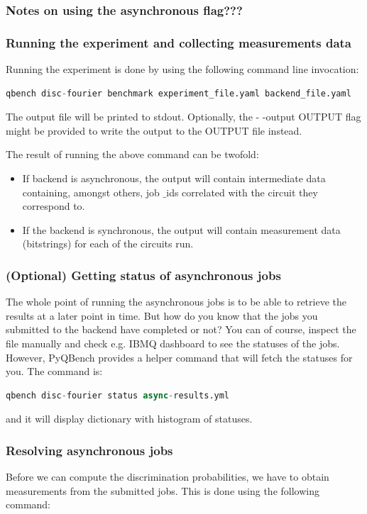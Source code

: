 \documentclass[preprint,12pt, a4paper, dvipsnames]{elsarticle}
\newcommand{\1}{{\rm 1\hspace{-0.9mm}l}}
\begin{document}
\subsubsection{Notes on using the asynchronous flag???}
\subsubsection{Running the experiment and collecting measurements data}
Running the experiment is done by using the following command line invocation:

\begin{lstlisting}[language=Python]
qbench disc-fourier benchmark experiment_file.yaml backend_file.yaml
\end{lstlisting}
The output file will be printed to stdout. Optionally, the - -output OUTPUT flag might be provided to write the output to the OUTPUT file instead.

The result of running the above command can be twofold:
\begin{itemize}
	\item If backend is asynchronous, the output will contain intermediate data containing, amongst others, job $\_$ids correlated with the circuit they correspond to.
	\item If the backend is synchronous, the output will contain measurement data (bitstrings) for each of the circuits run.
\end{itemize}




\subsubsection{(Optional) Getting status of asynchronous jobs}
The whole point of running the asynchronous jobs is to be able to retrieve the results at a later point in time. But how do you know that the jobs you submitted to the backend have completed or not? You can of course, inspect the file manually and check e.g. IBMQ dashboard to see the statuses of the jobs. However, PyQBench provides a helper command that will fetch the statuses for you. The command is:
\begin{lstlisting}[language=Python]
qbench disc-fourier status async-results.yml
\end{lstlisting}
and it will display dictionary with histogram of statuses.



\subsubsection{Resolving asynchronous jobs}
Before we can compute the discrimination probabilities, we have to obtain measurements from the submitted jobs. This is done using the following command:
\end{document}
